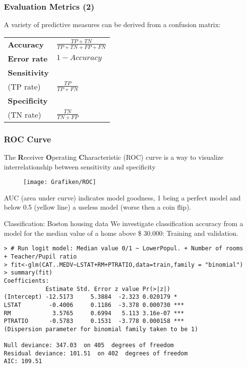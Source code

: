 \documentclass{beamer}
\begin{document}
\begin{frame}
	\frametitle{Evaluation Metrics (2)}
	
	A variety of predictive measures can be derived from a confusion matrix: 
	
	\vspace{0.5cm}
	
	\begin{tabular}{ l p{8.5cm}}
	\textbf{	Accuracy} & $\frac{TP + TN}{TP + TN + FP + FN}$  \\[0.5cm]
		\textbf{Error rate} & $ 1 - Accuracy$  \\ [0.5cm]
		\textbf{Sensitivity} \\ (TP rate) &  $\frac{TP}{TP + FN}$ \\[0.5cm]
		\textbf{Specificity} \\ (TN rate) &  $\frac{TN}{TN + FP}$ \\ [0.5cm]
		
	\end{tabular}
\end{frame}


\begin{frame}
	\frametitle{ROC Curve}
	
	The \textbf{R}eceiver \textbf{O}perating \textbf{C}haracteristic (ROC) curve is a way to visualize 
	interrelationship between sensitivity and specificity
	
		\begin{figure}
			\centering
			\texttt{[image: Grafiken/ROC]}
			\label{fig:ROC}
		\end{figure}
	
	AUC (area under curve) indicates model goodness, 1 being a perfect model 
	and below 0.5 (yellow line) a useless model (worse then a coin flip).
	
	
\end{frame}



\begin{frame}[fragile]{Classification: Boston housing data}
We investigate classification accuracy from a model for the median value of a home above \$ 30.000: Training and validation.
\begin{lstlisting}
> # Run logit model: Median value 0/1 ~ LowerPopul. + Number of rooms + Teacher/Pupil ratio
> fit<-glm(CAT..MEDV~LSTAT+RM+PTRATIO,data=train,family = "binomial")
> summary(fit)
Coefficients:
            Estimate Std. Error z value Pr(>|z|)
(Intercept) -12.5173     5.3884  -2.323 0.020179 *
LSTAT        -0.4006     0.1186  -3.378 0.000730 ***
RM            3.5765     0.6994   5.113 3.16e-07 ***
PTRATIO      -0.5783     0.1531  -3.778 0.000158 ***
(Dispersion parameter for binomial family taken to be 1)

Null deviance: 347.03  on 405  degrees of freedom
Residual deviance: 101.51  on 402  degrees of freedom
AIC: 109.51
\end{lstlisting}
\end{frame}
\end{document}
